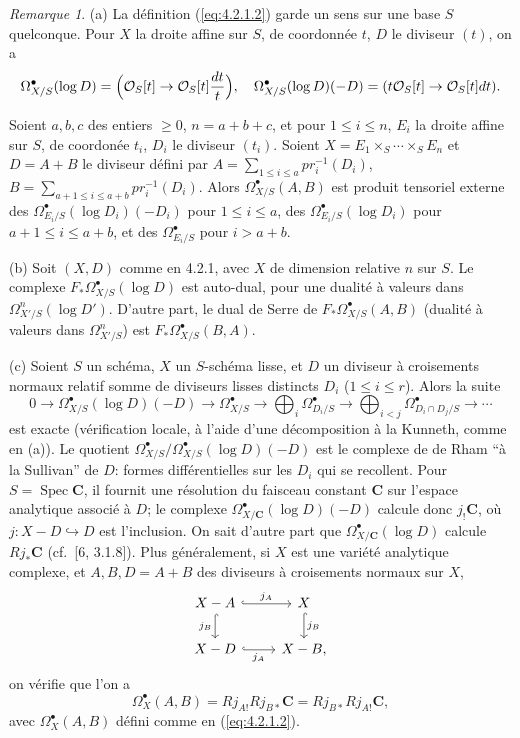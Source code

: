 \documentclass[12pt,a4paper]{article}
\theoremstyle{plain}
\theoremstyle{definition}
\theoremstyle{remark}
\newtheorem{remark}[theorem]{Remarque}
\DeclareMathOperator{\Spec}{Spec}
\newcommand{\cO}{\mathcal{O}}
\begin{document}
\begin{remark}\label{rem:4.2.2}
\textup{(a)} La d\'efinition (\ref{eq:4.2.1.2}) garde un sens sur une base $S$ quelconque. Pour $X$ la droite affine sur $S$, de coordonn\'ee $t$, $D$ le diviseur $(t)$, on a
\[
\Omega^{\bullet}_{X/S}(\log D) = \Bigl(\cO_S[t] \to \cO_S[t] \frac{dt}{t}\Bigr), \quad
\Omega^{\bullet}_{X/S}(\log D)(-D) = (t\cO_S[t] \to \cO_S[t] dt).
\]

Soient $a, b, c$ des entiers $\ge 0$, $n = a + b + c$, et pour $1 \le i \le n$, $E_i$ la droite affine sur $S$, de coordon\'ee $t_i$, $D_i$ le diviseur $(t_i)$. Soient $X = E_1 \times_S \cdots \times_S E_n$ et $D = A + B$ le diviseur d\'efini par $A = \sum_{1 \le i \le a} pr_i^{-1}(D_i)$, $B = \sum_{a+1 \le i \le a+b} pr_i^{-1}(D_i)$. Alors $\Omega^{\bullet}_{X/S}(A, B)$ est produit tensoriel externe des $\Omega^{\bullet}_{E_i/S}(\log D_i)(-D_i)$ pour $1 \le i \le a$, des $\Omega^{\bullet}_{E_i/S}(\log D_i)$ pour $a+1 \le i \le a+b$, et des $\Omega^{\bullet}_{E_i/S}$ pour $i > a+b$.

\textup{(b)} Soit $(X, D)$ comme en 4.2.1, avec $X$ de dimension relative $n$ sur $S$. Le complexe $F_* \Omega^{\bullet}_{X/S}(\log D)$ est auto-dual, pour une dualit\'e \`a valeurs dans $\Omega^n_{X'/S}(\log D')$. D'autre part, le dual de Serre de $F_* \Omega^{\bullet}_{X/S}(A, B)$ (dualit\'e \`a valeurs dans $\Omega^n_{X'/S}$) est $F_* \Omega^{\bullet}_{X/S}(B, A)$.

\textup{(c)} Soient $S$ un sch\'ema, $X$ un $S$-sch\'ema lisse, et $D$ un diviseur \`a croisements normaux relatif somme de diviseurs lisses distincts $D_i$ ($1 \le i \le r$). Alors la suite
\[
0 \to \Omega^{\bullet}_{X/S}(\log D)(-D) \to \Omega^{\bullet}_{X/S} \to \bigoplus_i \Omega^{\bullet}_{D_i/S} \to \bigoplus_{i<j} \Omega^{\bullet}_{D_i \cap D_j/S} \to \cdots
\]
est exacte (v\'erification locale, \`a l'aide d'une d\'ecomposition \`a la Kunneth, comme en (a)). Le quotient $\Omega^{\bullet}_{X/S}/\Omega^{\bullet}_{X/S}(\log D)(-D)$ est le complexe de de Rham ``\`a la Sullivan'' de $D$: formes diff\'erentielles sur les $D_i$ qui se recollent. Pour $S = \Spec \mathbf{C}$, il fournit une r\'esolution du faisceau constant $\mathbf{C}$ sur l'espace analytique associ\'e \`a $D$; le complexe $\Omega^{\bullet}_{X/\mathbf{C}}(\log D)(-D)$ calcule donc $j_! \mathbf{C}$, o\`u $j: X - D \hookrightarrow D$ est l'inclusion. On sait d'autre part que $\Omega^{\bullet}_{X/\mathbf{C}}(\log D)$ calcule $Rj_* \mathbf{C}$ (cf.~[6, 3.1.8]). Plus g\'en\'eralement, si $X$ est une vari\'et\'e analytique complexe, et $A, B, D = A + B$ des diviseurs \`a croisements normaux sur $X$,
\[
\begin{tikzcd}
X - A \arrow[r, hook, "j_A"] \arrow[d, hook, "j_B"'] & X \arrow[d, hook, "j_B"] \\
X - D \arrow[r, hook, "j_A"'] & X - B,
\end{tikzcd}
\]
on v\'erifie que l'on a
\[
\Omega^{\bullet}_X(A, B) = Rj_{A!} Rj_{B*} \mathbf{C} = Rj_{B*} Rj_{A!} \mathbf{C},
\]
avec $\Omega^{\bullet}_X(A, B)$ d\'efini comme en (\ref{eq:4.2.1.2}).
\end{remark}
\end{document}
